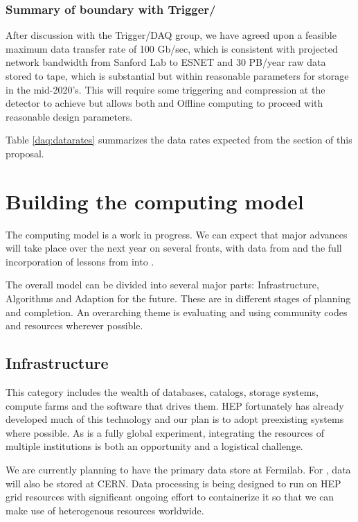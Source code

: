 \subsubsection{Summary of boundary with Trigger/}

After discussion with the Trigger/DAQ group, we have agreed upon a feasible maximum data transfer rate of 100 Gb/sec, which is consistent with projected network bandwidth from Sanford Lab to ESNET and 30 PB/year raw data stored to tape, which is substantial but within reasonable parameters for storage in the mid-2020's.  This will require some triggering and compression at the detector to achieve but allows both  and Offline computing to proceed with reasonable design parameters.

Table \ref{daq:datarates} summarizes the data rates expected from the  section of this proposal. 



\section{Building the computing model}\label{sw:bld-cmp-mdl}

The   computing model is a work in progress.  We can expect that major advances will take place over the next year on several fronts, with data from  and the full incorporation of lessons from   into  . 


The overall model can be divided into several major parts:  Infrastructure, Algorithms and Adaption for the future.  These are in different stages of planning and completion.  An overarching theme is evaluating and using community codes and resources wherever possible. 



\subsection{Infrastructure}
This category includes the wealth of databases, catalogs, storage systems, compute farms and the software that drives them.  HEP fortunately has already developed much of this technology and our plan is to adopt preexisting systems where possible.  As   is a fully global experiment, integrating the resources of multiple institutions is both an opportunity and a logistical challenge.

We are currently planning to have the primary data store at Fermilab.  For , data will also be stored at CERN.  Data processing is being designed to run on HEP grid resources with significant ongoing effort to containerize it so that we can make use of heterogenous resources worldwide. 


